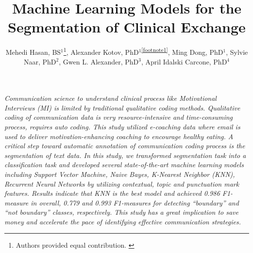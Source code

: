 \documentclass{amia}
\begin{document}
\title{Machine Learning Models for the Segmentation of Clinical Exchange}

\author{Mehedi Hasan, BS$^{1}$\footnote[1]{Authors provided equal contribution. \label{footnote1}}, Alexander Kotov, PhD$^{1}$\textsuperscript{\ref{footnote1}}, Ming Dong, PhD$^{1}$, Sylvie Naar, PhD$^{2}$, Gwen L. Alexander, PhD$^{3}$, April Idalski Carcone, PhD$^{4}$}


\maketitle

\textit{Communication science to understand clinical process like Motivational Interviews (MI) is limited by traditional qualitative coding methods. Qualitative coding of communication data is very resource-intensive and time-consuming process, requires auto coding. This study utilized e-coaching data where email is used to deliver motivation-enhancing coaching to encourage healthy eating. A critical step toward automatic annotation of communication coding process is the segmentation of text data. In this study, we transformed segmentation task into a classification task and developed several state-of-the-art machine learning models including Support Vector Machine, Naive Bayes, K-Nearest Neighbor (KNN), Recurrent Neural Networks by utilizing contextual, topic and punctuation mark features. Results indicate that KNN is the best model and achieved 0.986 F1-measure in overall, 0.779 and 0.993 F1-measures for detecting ``boundary'' and ``not boundary'' classes, respectively. This study has a great implication to save money and accelerate the pace of identifying effective communication strategies.}
\end{document}
